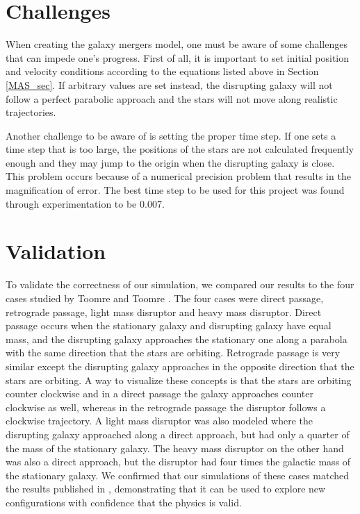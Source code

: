 \documentclass[11pt]{article}
\begin{document}
\section{Challenges}

When creating the galaxy mergers model, one must be aware of some challenges that can impede one's progress.  First of all, it is important to set initial position and velocity conditions according to the equations listed above in Section \ref{MAS_sec}.  If arbitrary values are set instead, the disrupting galaxy will not follow a perfect parabolic approach and the stars will not move along realistic trajectories.

Another challenge to be aware of is setting the proper time step.  If one sets a time step that is too large, the positions of the stars are not calculated frequently enough and they may jump to the origin when the disrupting galaxy is close.  This problem occurs because of a numerical precision problem that results in the magnification of error.  The best time step to be used for this project was found through experimentation to be 0.007.

\section{Validation}

To validate the correctness of our simulation, we compared our results to the four cases studied by Toomre and Toomre \cite{Toomre1972}.  The four cases were direct passage, retrograde passage, light mass disruptor and heavy mass disruptor.  Direct passage occurs when the stationary galaxy and disrupting galaxy have equal mass, and the disrupting galaxy approaches the stationary one along a parabola with the same direction that the stars are orbiting.   Retrograde passage is very similar except the disrupting galaxy approaches in the opposite direction that the stars are orbiting.  A way to visualize these concepts is that the stars are orbiting counter clockwise and in a direct passage the galaxy approaches counter clockwise as well, whereas in the retrograde passage the disruptor follows a clockwise trajectory.  A light mass disruptor was also modeled where the disrupting galaxy approached along a direct approach, but had only a quarter of the mass of the stationary galaxy.  The heavy mass disruptor on the other hand was also a direct approach, but the disruptor had four times the galactic mass of the stationary galaxy.  We confirmed that our simulations of these cases matched the results published in \cite{Toomre1972}, demonstrating that it can be used to explore new configurations with confidence that the physics is valid. 
\end{document}
